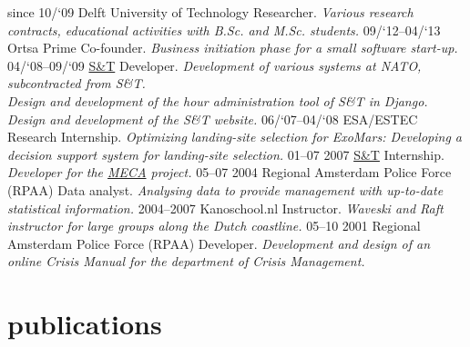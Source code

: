 \documentclass[]{friggeri-cv}
\begin{document}
\begin{entrylist}
  \entry
    {since 10/`09}
    {Delft University of Technology}
    {Researcher.}
    {\emph{Various research contracts, educational activities with B.Sc. and M.Sc. students.}}
  \entry
    {09/`12–04/`13}
    {Ortsa Prime}
    {Co-founder.}
    {\emph{Business initiation phase for a small software start-up.}}
  \entry
    {04/`08–09/`09}
    {\href{http://stcorp.nl}{S\&T}}
    {Developer.}
    {\emph{Development of various systems at NATO, subcontracted from S\&T. \\
           Design and development of the hour administration tool of S\&T in Django. \\
           Design and development of the S\&T website.
           }}
  \entry
    {06/`07–04/`08}
    {ESA/ESTEC}
    {Research Internship.}
    {\emph{Optimizing landing-site selection for ExoMars: Developing a decision support system for landing-site selection.}}
  \entry
    {01–07 2007}
    {\href{http://stcorp.nl}{S\&T}}
    {Internship.}
    {\emph{Developer for the \href{http://crewassistant.com}{MECA} project.}}
  \entry
    {05–07 2004}
    {Regional Amsterdam Police Force (RPAA)}
    {Data analyst.}
    {\emph{Analysing data to provide management with up-to-date statistical information.}}
  \entry
    {2004–2007}
    {Kanoschool.nl}
    {Instructor.}
    {\emph{Waveski and Raft instructor for large groups along the Dutch coastline.}}
  \entry
    {05–10 2001}
    {Regional Amsterdam Police Force (RPAA)}
    {Developer.}
    {\emph{Development and design of an online Crisis Manual for the department of Crisis Management.}}
\end{entrylist}

\section{publications}

\begin{refsection}
  \nocite{*}
  \printbibliography[sorting=chronological, type=inproceedings, title={international peer-reviewed conferences/proceedings}, notkeyword={france}, heading=subbibliography]
\end{refsection}
\begin{refsection}
  \nocite{*}
  \printbibliography[sorting=chronological, type=inproceedings, title={local peer-reviewed conferences/proceedings}, keyword={france}, heading=subbibliography]
\end{refsection}
\end{document}
